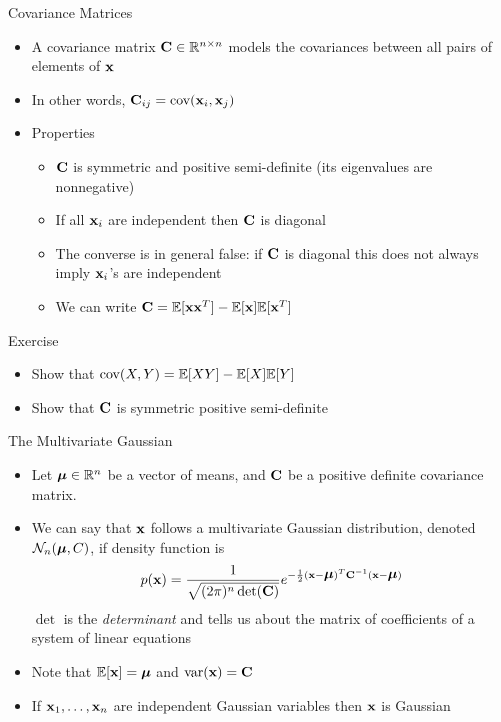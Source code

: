 \documentclass{beamer}
\begin{document}
\begin{frame}{Covariance Matrices} 
\begin{itemize} 
 \item A covariance matrix $\textbf{C} \in \mathbb{R}^{n \times n}$ models the covariances between all pairs of elements of $\textbf{x}$
 \item In other words, $\textbf{C}_{ij} = \mbox{cov}(\textbf{x}_i, \textbf{x}_j)$
 \item Properties 
 \begin{itemize}
 \item $\textbf{C}$ is symmetric and positive semi-definite (its eigenvalues are nonnegative) 
 \item If all $\textbf{x}_i$ are independent then $\textbf{C}$ is diagonal 
 \item The converse is in general false: if $\textbf{C}$ is diagonal this does not always imply $\textbf{x}_i$'s are independent 
 \item We can write $\textbf{C} = \mathbb{E}[\textbf{x}\textbf{x}^T] - \mathbb{E}[\textbf{x}]\mathbb{E}[\textbf{x}^T]$
 \end{itemize} 
\end{itemize}
\end{frame}

\begin{frame}{Exercise}  
\begin{itemize} 
 \item Show that $\mbox{cov}(X, Y) = \mathbb{E}[XY] - \mathbb{E}[X]\mathbb{E}[Y]$
 \item Show that $\textbf{C}$ is symmetric positive semi-definite 
\end{itemize} 
\end{frame}

\begin{frame}{The Multivariate Gaussian}  
\begin{itemize} 
 \item Let $\mbox{\boldmath$\mu$} \in \mathbb{R}^n$ be a vector of means, and $\textbf{C}$ be a positive definite covariance matrix. 
 \item We can say that $\textbf{x}$ follows a multivariate Gaussian distribution, denoted $\mathcal{N}_n(\mbox{\boldmath$\mu$}, C)$, if density function is 
 \begin{displaymath} 
  p(\textbf{x}) = \frac{1}{\sqrt{(2\pi)^n \det(\textbf{C})}} e^{-\frac{1}{2}(\textbf{x} - \mbox{\boldmath$\mu$})^T\textbf{C}^{-1}(\textbf{x} - \mbox{\boldmath$\mu$})}  
 \end{displaymath}
 $\det$ is the \emph{determinant} and tells us about the matrix of coefficients of a system of linear equations
 \item Note that $\mathbb{E}[\textbf{x}] = \mbox{\boldmath$\mu$}$ and $\mbox{var}(\textbf{x}) = \textbf{C}$  
 \item If $\textbf{x}_1, \ldots, \textbf{x}_n$ are independent Gaussian variables then $\textbf{x}$ is Gaussian 
\end{itemize}
\end{frame}
\end{document}

